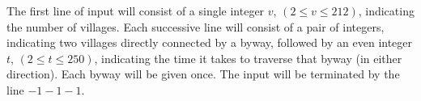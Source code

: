 The first line of input will consist of a single integer $v$, $(2 \le v \le 212)$,
indicating the number of villages. Each successive line will consist of a pair of
integers, indicating two villages directly connected by a byway, followed by an
even integer $t$, $(2 \le t \le 250)$, indicating the time it takes to traverse that
byway (in either direction). Each byway will be given once. The input will be
terminated by the line $-1 -1 -1$.
